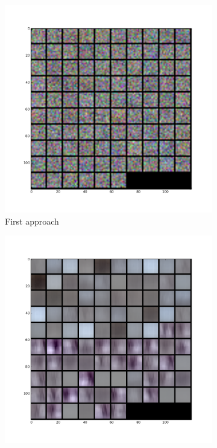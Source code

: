 \begin{figure}[!h]
\centering
\begin{subfigure}{0.33\textwidth}
\label{1appfilter}
\centering
\includegraphics[width=0.9\linewidth]{images/regression/conv1_26_135000.png}
\caption{First approach}
\end{subfigure}%
\begin{subfigure}{0.33\textwidth}
\label{2appfilter}
\centering
\includegraphics[width=0.9\linewidth]{images/regression/conv1_37_135000.png}

\end{subfigure}
\end{figure}
